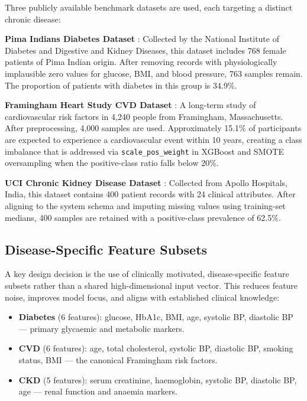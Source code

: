 ﻿\documentclass[conference]{IEEEtran}
\begin{document}
Three publicly available benchmark datasets are used, each targeting a distinct chronic
disease:

\textbf{Pima Indians Diabetes Dataset} \cite{smith1988pima}: Collected by the National
Institute of Diabetes and Digestive and Kidney Diseases, this dataset includes 768 female
patients of Pima Indian origin. After removing records with physiologically implausible
zero values for glucose, BMI, and blood pressure, 763 samples remain. The proportion of
patients with diabetes in this group is 34.9\%.

\textbf{Framingham Heart Study CVD Dataset} \cite{wilson1998framingham}: A long-term
study of cardiovascular risk factors in 4,240 people from Framingham, Massachusetts.
After preprocessing, 4,000 samples are used. Approximately 15.1\% of participants are
expected to experience a cardiovascular event within 10 years, creating a class imbalance
that is addressed via \texttt{scale\_pos\_weight} in XGBoost and SMOTE oversampling when
the positive-class ratio falls below 20\%.

\textbf{UCI Chronic Kidney Disease Dataset} \cite{rubini2015ckd}: Collected from Apollo
Hospitals, India, this dataset contains 400 patient records with 24 clinical attributes.
After aligning to the system schema and imputing missing values using training-set
medians, 400 samples are retained with a positive-class prevalence of 62.5\%.

\subsection{Disease-Specific Feature Subsets}

A key design decision is the use of clinically motivated, disease-specific feature
subsets rather than a shared high-dimensional input vector. This reduces feature noise,
improves model focus, and aligns with established clinical knowledge:

\begin{itemize}
    \item \textbf{Diabetes} (6 features): glucose, HbA1c, BMI, age, systolic BP,
          diastolic BP --- primary glycaemic and metabolic markers.
    \item \textbf{CVD} (6 features): age, total cholesterol, systolic BP, diastolic BP,
          smoking status, BMI --- the canonical Framingham risk factors.
    \item \textbf{CKD} (5 features): serum creatinine, haemoglobin, systolic BP,
          diastolic BP, age --- renal function and anaemia markers.
\end{itemize}
\end{document}
